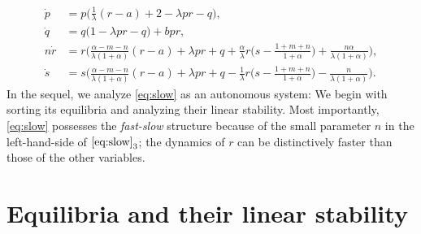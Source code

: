 \documentclass[a4paper,11pt]{article}
\theoremstyle{remark}
\begin{document}
\begin{equation}\label{eq:slow} \tag{S}
 \begin{aligned}
 \dot{p} &=p\Big(\frac{1}{\lambda}(r-a) + 2- \lambda p r -q\Big),\\
 \dot{q} &=q\Big(1 -\lambda p r -q\Big) + b p r,\\
 n\dot{r} &=r\Big(\frac{\alpha-m-n}{\lambda(1+\alpha)}(r-a) + \lambda pr + q +\frac{\alpha}{\lambda}r\big(s- \frac{1+m+n}{1+\alpha}\big) + \frac{n\alpha}{\lambda(1+\alpha)}\Big),\\
 \dot{s} &=s\Big(\frac{\alpha-m-n}{\lambda(1+\alpha)}(r-a) + \lambda pr + q - \frac{1}{\lambda}r\big(s- \frac{1+m+n}{1+\alpha}\big) - \frac{n}{\lambda(1+\alpha)}\Big).
 \end{aligned}
\end{equation}
In the sequel, we analyze \eqref{eq:slow} as an autonomous system: We begin with sorting its equilibria and analyzing their linear stability. Most importantly, \eqref{eq:slow} possesses the {\it fast-slow} structure because of the small parameter $n$ in the left-hand-side of $\eqref{eq:slow}_3$; the dynamics of $r$ can be distinctively faster than those of the other variables.



\vfil\eject

\section{Equilibria and their linear stability} \label{sec:equil}
\end{document}
